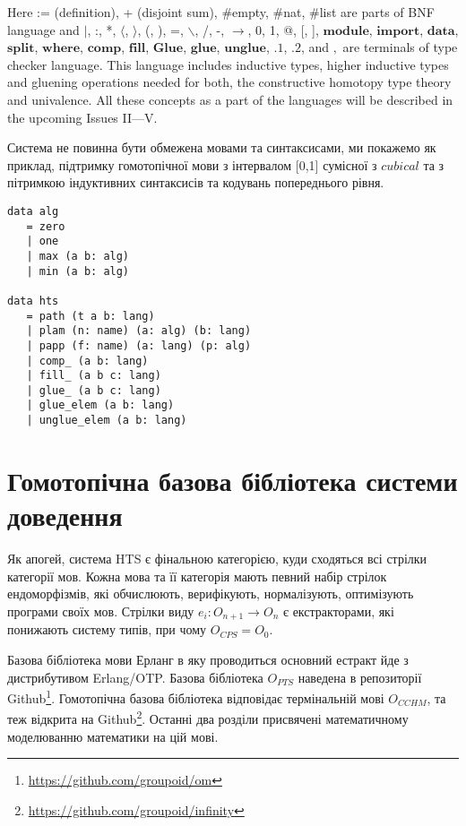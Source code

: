 \begin{definition}
\begin{definition}
\begin{definition}
\begin{definition}
Here := (definition), + (disjoint sum), \#empty, \#nat, \#list are parts of BNF language and
$\rvert$, :, *, $\langle$, $\rangle$, (, ), =, $\backslash$, /, -, $\rightarrow$, 0, 1, @, [, ],
$\mathbf{module}$, $\mathbf{import}$,
$\mathbf{data}$, $\mathbf{split}$, $\mathbf{where}$, $\mathbf{comp}$, $\mathbf{fill}$,
$\mathbf{Glue}$, $\mathbf{glue}$, $\mathbf{unglue}$,
$\mathbf{.1}$, $\mathbf{.2}$,
 and $,$ are terminals of type checker language. This language includes
inductive types, higher inductive types and gluening operations needed for
both, the constructive homotopy type theory and univalence. All these concepts as a part of the languages
will be described in the upcoming Issues II---V.

Система не повинна бути обмежена мовами та синтаксисами, ми покажемо як приклад,
підтримку гомотопічної мови з інтервалом [0,1] сумісної з $cubical$ та з пітримкою індуктивних
синтаксисів та кодувань попереднього рівня.

\begin{lstlisting}[mathescape=true]
data alg
   = zero
   | one
   | max (a b: alg)
   | min (a b: alg)

data hts
   = path (t a b: lang)
   | plam (n: name) (a: alg) (b: lang)
   | papp (f: name) (a: lang) (p: alg)
   | comp_ (a b: lang)
   | fill_ (a b c: lang)
   | glue_ (a b c: lang)
   | glue_elem (a b: lang)
   | unglue_elem (a b: lang)
\end{lstlisting}

\section{Гомотопічна базова бібліотека системи доведення}

Як апогей, система HTS є фінальною категорією,
куди сходяться всі стрілки категорії мов. Кожна мова та її категорія
мають певний набір стрілок ендоморфізмів, які обчислюють, верифікують,
нормалізують, оптимізують програми своїх мов.
Стрілки виду $e_i: O_{n+1} \rightarrow O_n$ є екстракторами, які понижають систему типів,
при чому $O_{CPS} = O_0$.

Базова бібліотека мови Ерланг в яку проводиться основний
естракт йде з дистрибутивом Erlang/OTP. Базова бібліотека
$O_{PTS}$ наведена в репозиторії Github\footnote{\url{https://github.com/groupoid/om}}.
Гомотопічна базова бібліотека відповідає термінальній мові $O_{CCHM}$, та теж відкрита
на Github\footnote{\url{https://github.com/groupoid/infinity}}.
Останні два розділи присвячені математичному моделюванню математики на цій мові.


\end{definition}
\end{definition}
\end{definition}
\end{definition}
